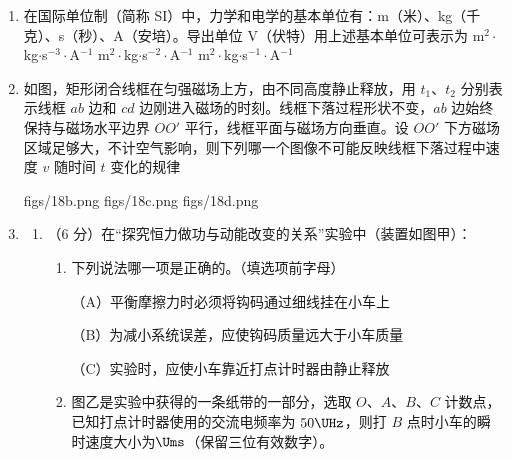 \documentclass[\gkver]{gaokaozhenti}
\begin{document}
\begin{enumerate}
\item
在国际单位制（简称 SI）中，力学和电学的基本单位有：m（米）、kg（千克）、s（秒）、A（安培）。导出单位 V（伏特）用上述基本单位可表示为
{m$^{2}\cdot$kg$\cdot$s$^{-3}\cdot$A$^{-1}$}
{m$^{2}\cdot$kg$\cdot$s$^{-2}\cdot$A$^{-1}$}
{m$^{2}\cdot$kg$\cdot$s$^{-1}\cdot$A$^{-1}$}

\item
如图，矩形闭合线框在匀强磁场上方，由不同高度静止释放，用 $t_{1}$、$t_{2}$ 分别表示线框 $ab$ 边和 $cd$ 边刚进入磁场的时刻。线框下落过程形状不变，$ab$ 边始终保持与磁场水平边界 $OO'$ 平行，线框平面与磁场方向垂直。设 $OO'$ 下方磁场区域足够大，不计空气影响，则下列哪一个图像不可能反映线框下落过程中速度 $v$ 随时间 $t$ 变化的规律


{figs/18b.png}
{figs/18c.png}
{figs/18d.png}

\item
\begin{enumerate}
	\item
	（6 分）在“探究恒力做功与动能改变的关系”实验中（装置如图甲）：
	\begin{enumerate}
		\item
		下列说法哪一项是正确的。（填选项前字母）

		（A）平衡摩擦力时必须将钩码通过细线挂在小车上

		（B）为减小系统误差，应使钩码质量远大于小车质量

		（C）实验时，应使小车靠近打点计时器由静止释放
		\item
		图乙是实验中获得的一条纸带的一部分，选取 $O$、$A$、$B$、$C$ 计数点，已知打点计时器使用的交流电频率为 $50\UHz$，则打 $B$ 点时小车的瞬时速度大小为$\Ums$（保留三位有效数字）。
	\end{enumerate}


\end{enumerate}
\end{enumerate}
\end{document}
